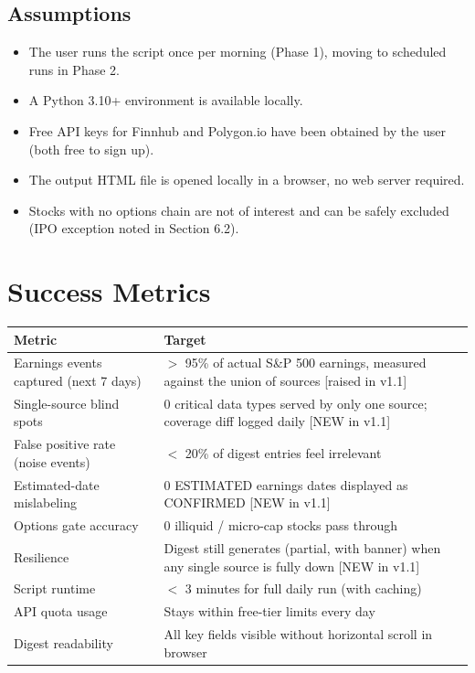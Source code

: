 \documentclass[11pt]{article}
\begin{document}
\subsection{Assumptions}
\begin{itemize}
  \item The user runs the script once per morning (Phase 1), moving to scheduled runs in Phase 2.
  \item A Python 3.10+ environment is available locally.
  \item Free API keys for Finnhub and Polygon.io have been obtained by the user (both free to sign up).
  \item The output HTML file is opened locally in a browser, no web server required.
  \item Stocks with no options chain are not of interest and can be safely excluded (IPO exception noted in Section 6.2).
\end{itemize}

\section{Success Metrics}

\begin{tabularx}{\textwidth}{|X|L{6.6cm}|}
\hline
\textbf{Metric} & \textbf{Target} \\
\hline
Earnings events captured (next 7 days) & $>$ 95\% of actual S\&P 500 earnings, measured against the union of sources \hfill [raised in v1.1] \\
\hline
Single-source blind spots & 0 critical data types served by only one source; coverage diff logged daily \hfill [NEW in v1.1] \\
\hline
False positive rate (noise events) & $<$ 20\% of digest entries feel irrelevant \\
\hline
Estimated-date mislabeling & 0 ESTIMATED earnings dates displayed as CONFIRMED \hfill [NEW in v1.1] \\
\hline
Options gate accuracy & 0 illiquid / micro-cap stocks pass through \\
\hline
Resilience & Digest still generates (partial, with banner) when any single source is fully down \hfill [NEW in v1.1] \\
\hline
Script runtime & $<$ 3 minutes for full daily run (with caching) \\
\hline
API quota usage & Stays within free-tier limits every day \\
\hline
Digest readability & All key fields visible without horizontal scroll in browser \\
\hline
\end{tabularx}
\end{document}

